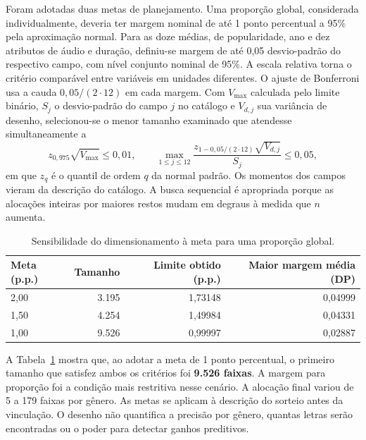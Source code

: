 Foram adotadas duas metas de planejamento. Uma proporção global, considerada individualmente, deveria ter margem nominal de até 1 ponto percentual a 95\% pela aproximação normal. Para as doze médias, de popularidade, ano e dez atributos de áudio e duração, definiu-se margem de até 0,05 desvio-padrão do respectivo campo, com nível conjunto nominal de 95\%. A escala relativa torna o critério comparável entre variáveis em unidades diferentes. O ajuste de Bonferroni usa a cauda $0,05/(2\cdot12)$ em cada margem. Com $V_{\max}$ calculada pelo limite binário, $S_j$ o desvio-padrão do campo $j$ no catálogo e $V_{d,j}$ sua variância de desenho, selecionou-se o menor tamanho examinado que atendesse simultaneamente a
\begin{equation}
z_{0{,}975}\sqrt{V_{\max}}\leq 0{,}01,\qquad
\max_{1\le j\le 12}\frac{z_{1-0{,}05/(2\cdot12)}\sqrt{V_{d,j}}}{S_j}\leq 0{,}05,
\end{equation}
em que $z_q$ é o quantil de ordem $q$ da normal padrão. Os momentos dos campos vieram da descrição do catálogo. A busca sequencial é apropriada porque as alocações inteiras por maiores restos mudam em degraus à medida que $n$ aumenta.

\begin{table}[H]\centering\small
\caption{Sensibilidade do dimensionamento à meta para uma proporção global.}\label{tab:dimensionamento}
\setlength{\tabcolsep}{5pt}
\begin{tabular}{@{}lrrr@{}}\toprule
Meta (p.p.) & Tamanho & Limite obtido (p.p.) & Maior margem média (DP) \\\midrule
2,00 & 3.195 & 1,73148 & 0,04999 \\
1,50 & 4.254 & 1,49984 & 0,04331 \\
1,00 & 9.526 & 0,99997 & 0,02887 \\\bottomrule
\end{tabular}
\end{table}

A Tabela~\ref{tab:dimensionamento} mostra que, ao adotar a meta de 1 ponto percentual, o primeiro tamanho que satisfez ambos os critérios foi \textbf{9.526 faixas}. A margem para proporção foi a condição mais restritiva nesse cenário. A alocação final variou de 5 a 179 faixas por gênero. As metas se aplicam à descrição do sorteio antes da vinculação. O desenho não quantifica a precisão por gênero, quantas letras serão encontradas ou o poder para detectar ganhos preditivos.

